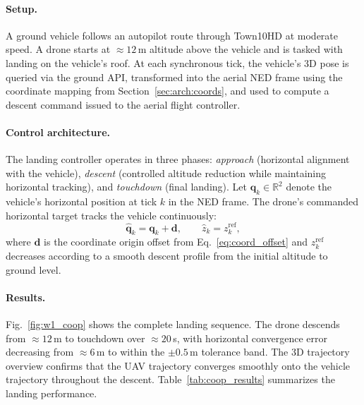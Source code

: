 \paragraph{Setup.}
A ground vehicle follows an autopilot route through Town10HD at moderate
speed.
A drone starts at ${\approx}12$\,m altitude above the vehicle and is tasked
with landing on the vehicle's roof.
At each synchronous tick, the vehicle's 3D pose is queried via the ground API,
transformed into the aerial NED frame using the coordinate mapping from
Section~\ref{sec:arch:coords}, and used to compute a descent command issued
to the aerial flight controller.

\paragraph{Control architecture.}
The landing controller operates in three phases: \emph{approach}
(horizontal alignment with the vehicle), \emph{descent} (controlled altitude
reduction while maintaining horizontal tracking), and \emph{touchdown}
(final landing).
Let $\mathbf{q}_k \in \mathbb{R}^2$ denote the vehicle's horizontal position
at tick $k$ in the NED frame.
The drone's commanded horizontal target tracks the vehicle continuously:
%
\begin{equation}
\hat{\mathbf{q}}_k = \mathbf{q}_k + \mathbf{d},
\qquad
\hat{z}_k = z_k^{\mathrm{ref}},
\label{eq:landing_control}
\end{equation}
%
where $\mathbf{d}$ is the coordinate origin offset from
Eq.~\eqref{eq:coord_offset} and $z_k^{\mathrm{ref}}$ decreases according to
a smooth descent profile from the initial altitude to ground level.

\paragraph{Results.}
Fig.~\ref{fig:w1_coop} shows the complete landing sequence.
The drone descends from ${\approx}12$\,m to touchdown over ${\approx}20$\,s,
with horizontal convergence error decreasing from ${\approx}6$\,m to within
the $\pm 0.5$\,m tolerance band.
The 3D trajectory overview confirms that the UAV trajectory converges smoothly
onto the vehicle trajectory throughout the descent.
Table~\ref{tab:coop_results} summarizes the landing performance.




